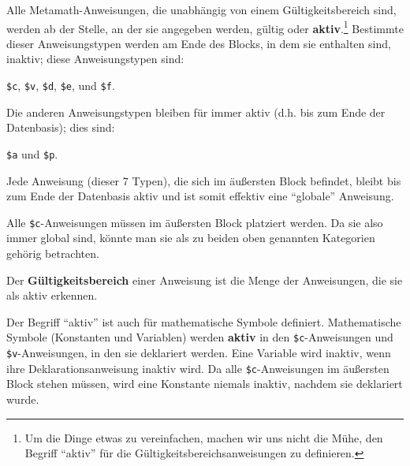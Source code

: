 Alle Metamath-Anweisungen, die unabhängig von einem Gültigkeitsbereich sind, werden ab der Stelle, an der sie angegeben werden, gültig oder {\bf aktiv}.\footnote{Um die Dinge etwas zu vereinfachen, machen wir uns nicht die Mühe, den Begriff "`aktiv"' für die Gültigkeitsbereichsanweisungen zu definieren.}  Bestimmte dieser Anweisungstypen werden am Ende des Blocks, in dem sie enthalten sind, inaktiv; diese Anweisungstypen sind:

\begin{center}
  \texttt{\$c}, \texttt{\$v}, \texttt{\$d}, \texttt{\$e}, und \texttt{\$f}.
\end{center}

Die anderen Anweisungstypen bleiben für immer aktiv (d.h. bis zum Ende der Datenbasis); dies sind:
\begin{center}
  \texttt{\$a} und \texttt{\$p}.
\end{center}
Jede Anweisung (dieser 7 Typen), die sich im äußersten Block befindet, bleibt bis zum Ende der Datenbasis aktiv und ist somit effektiv eine "`globale"' Anweisung.

Alle \texttt{\$c}-Anweisungen müssen im äußersten Block platziert werden.  Da sie also immer global sind, könnte man sie als zu beiden oben genannten Kategorien gehörig betrachten.

Der {\bf Gültigkeitsbereich} einer Anweisung ist die Menge der Anweisungen, die sie als aktiv erkennen.


Der Begriff "`aktiv"' ist auch für mathematische Symbole definiert.  Mathematische Symbole (Konstanten und Variablen) werden {\bf aktiv} in den \texttt{\$c}-Anweisungen und \texttt{\$v}-Anweisungen, in den sie deklariert werden. Eine Variable wird inaktiv, wenn ihre Deklarationsanweisung inaktiv wird.  Da alle \texttt{\$c}-Anweisungen im äußersten Block stehen müssen, wird eine Konstante niemals inaktiv, nachdem sie deklariert wurde.

